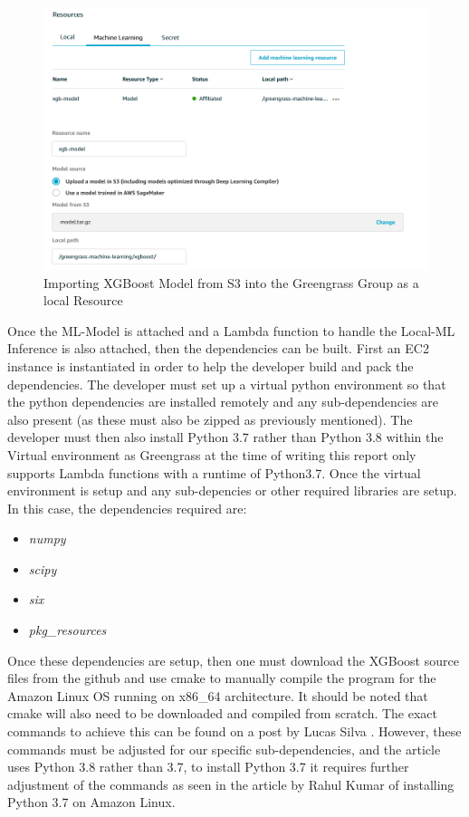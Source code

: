 \begin{figure}[ht]
    \centering
    \includegraphics[width=1\linewidth]{pages/Chapter4/Chapter 4 Images/LambdaFns/xgboost_model_import_ggc.png}
    \caption{Importing XGBoost Model from S3 into the Greengrass Group as a local Resource}
    \label{fig:ggc_model_import}
\end{figure}

Once the ML-Model is attached and a Lambda function to handle the Local-ML Inference is also attached, then the dependencies can be built. First an EC2 instance is instantiated in order to help the developer build and pack the dependencies. The developer must set up a virtual python environment so that the python dependencies are installed remotely and any sub-dependencies are also present (as these must also be zipped as previously mentioned). The developer must then also install Python 3.7 rather than Python 3.8 within the Virtual environment as Greengrass at the time of writing this report only supports Lambda functions with a runtime of Python3.7. Once the virtual environment is setup and any sub-depencies or other required libraries are setup. In this case, the dependencies required are:
\begin{itemize}
    \item \textit{numpy}
    \item \textit{scipy}
    \item \textit{six}
    \item \textit{pkg\_resources}
\end{itemize}
Once these dependencies are setup, then one must download the XGBoost source files from the github and use cmake to manually compile the program for the Amazon Linux OS running on x86\_64 architecture. It should be noted that cmake will also need to be downloaded and compiled from scratch. The exact commands to achieve this can be found on a post by Lucas Silva \cite{silva_2019}. However, these commands must be adjusted for our specific sub-dependencies, and the article uses Python 3.8 rather than 3.7, to install Python 3.7 it requires further adjustment of the commands as seen in the article by Rahul Kumar of installing Python 3.7 on Amazon Linux. \cite{kumar_2020} 


